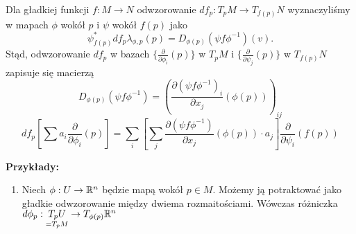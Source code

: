 Dla gładkiej funkcji $f:M\to N$ odwzorowanie $df_p:T_pM\to T_{f(p)}N$ wyznaczyliśmy w mapach $\phi$ wokół $p$ i $\psi$ wokół $f(p)$ jako
$$\psi_{f(p)}^*df_p\lambda_{\phi, p}(p)=D_{\phi(p)}(\psi f\phi^{-1})(v).$$
Stąd, odwzorowanie $df_p$ w bazach $\{\frac{\partial}{\partial\phi_i}(p)\}$ w $T_pM$ i $\{\frac{\partial}{\partial\psi_j}(p)\}$ w $T_{f(p)}N$ zapisuje się macierzą
$$D_{\phi(p)}(\psi f\phi^{-1})=\left(\frac{\partial(\psi f\phi^{-1})_i}{\partial x_j}(\phi(p))\right)_{ij}$$
$$df_p\left[\sum a_i\frac{\partial}{\partial\phi_i}(p)\right]=\sum_i\left[\sum_j\frac{\partial(\psi f\phi^{-1})}{\partial x_j}(\phi(p))\cdot a_j\right]\frac{\partial}{\partial\psi_i}(f(p)) $$

\textbf{Przykłady:}
\begin{enumerate}
  \item Niech $\phi:U\to\mathbb{R}^n$ będzie mapą wokół $p\in M$. Możemy ją potraktować jako gładkie odwzorowanie między dwiema rozmaitościami. Wówczas różniczka $d\phi_p:\underset{{\scriptstyle =T_pM}}{T_pU}\to T_{\phi(p)}\mathbb{R}^n$
\end{enumerate}
